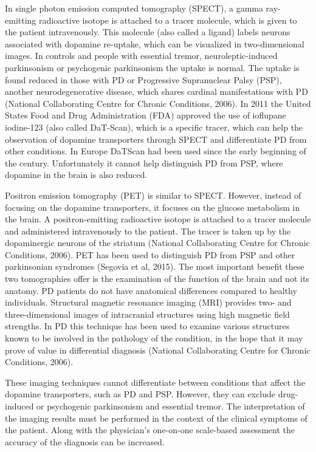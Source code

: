 In single photon emission computed tomography (\gls{SPECT}), a gamma ray-emitting radioactive isotope is attached to a tracer molecule, which is given to the patient intravenously. This molecule (also called a ligand) labels neurons associated with dopamine re-uptake, which can be visualized in two-dimensional images. In controls and people with essential tremor, neuroleptic-induced parkinsonism or psychogenic parkinsonism the uptake is normal. The uptake is found reduced in those with \gls{PD} or Progressive Supranuclear Palsy (\gls{PSP}), another neurodegenerative disease, which shares cardinal manifestations with \gls{PD} (National Collaborating Centre for Chronic Conditions, 2006). In 2011 the United States Food and Drug Administration (\gls{FDA}) approved the use of ioflupane iodine-123 (also called DaT-Scan), which is a specific tracer, which can help the observation of dopamine transporters through \gls{SPECT} and differentiate \gls{PD} from other conditions. In Europe DaTScan had been used since the early beginning of the century. Unfortunately it cannot help distinguish \gls{PD} from \gls{PSP}, where dopamine in the brain is also reduced.

Positron emission tomography (\gls{PET}) is similar to \gls{SPECT}. However, instead of focusing on the dopamine transporters, it focuses on the glucose metabolism in the brain. A positron-emitting radioactive isotope is attached to a tracer molecule and administered intravenously to the patient. The tracer is taken up by the dopaminergic neurons of the striatum (National Collaborating Centre for Chronic Conditions, 2006). \gls{PET} has been used to distinguish \gls{PD} from PSP and other parkinsonian syndromes (Segovia et al, 2015). The most important benefit these two tomographies offer is the examination of the function of the brain and not its anatomy. \gls{PD} patients do not have anatomical differences compared to healthy individuals. Structural magnetic resonance imaging (\gls{MRI}) provides two- and three-dimensional images of intracranial structures using high magnetic field strengths. In \gls{PD} this technique has been used to examine various structures known to be involved in the pathology of the condition, in the hope that it may prove of value in differential diagnosis (National Collaborating Centre for Chronic Conditions, 2006).

These imaging techniques cannot differentiate between conditions that affect the dopamine transporters, such as \gls{PD} and \gls{PSP}. However, they can exclude drug-induced or psychogenic parkinsonism and essential tremor. The interpretation of the imaging results must be performed in the context of the clinical symptoms of the patient. Along with the physician's one-on-one scale-based assessment the accuracy of the diagnosis can be increased. 

